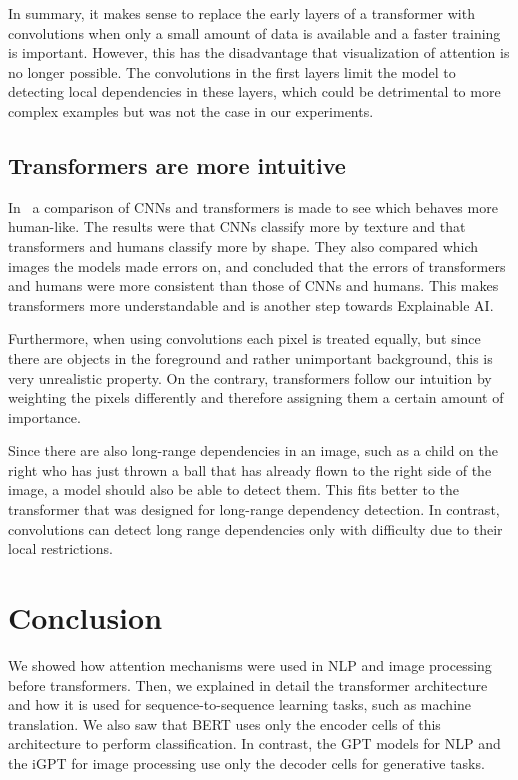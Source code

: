 \documentclass[a4paper]{scrartcl}
\let\stdsection\section
\renewcommand\section{\newpage\stdsection}
\begin{document}
    In summary, it makes sense to replace the early layers of a transformer with convolutions when only a small amount of data is available and a faster training is important.
    However, this has the disadvantage that visualization of attention is no longer possible.
    The convolutions in the first layers limit the model to detecting local dependencies in these layers, which could be detrimental to more complex examples but was not the case in our experiments.

    \subsection{Transformers are more intuitive}\label{subsec:transformers-are-more-intuitive}
    In~\cite{tuli2021are} a comparison of CNNs and transformers is made to see which behaves more human-like.
    The results were that CNNs classify more by texture and that transformers and humans classify more by shape.
    They also compared which images the models made errors on, and concluded that the errors of transformers and humans were more consistent than those of CNNs and humans.
    This makes transformers more understandable and is another step towards Explainable AI\@.

    Furthermore, when using convolutions each pixel is treated equally, but since there are objects in the foreground and rather unimportant background, this is very unrealistic property.
    On the contrary, transformers follow our intuition by weighting the pixels differently and therefore assigning them a certain amount of importance.

    Since there are also long-range dependencies in an image, such as a child on the right who has just thrown a ball that has already flown to the right side of the image, a model should also be able to detect them.
    This fits better to the transformer that was designed for long-range dependency detection.
    In contrast, convolutions can detect long range dependencies only with difficulty due to their local restrictions.



    \section{Conclusion}\label{sec:conclusion}
    We showed how attention mechanisms were used in NLP and image processing before transformers.
    Then, we explained in detail the transformer architecture and how it is used for sequence-to-sequence learning tasks, such as machine translation.
    We also saw that BERT uses only the encoder cells of this architecture to perform classification.
    In contrast, the GPT models for NLP and the iGPT for image processing use only the decoder cells for generative tasks.
\end{document}
